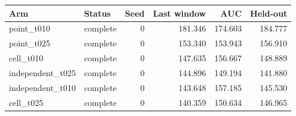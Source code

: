 \begin{tabular}{llrrrr}
Arm & Status & Seed & Last window & AUC & Held-out \\
\hline
point\_t010 & complete & 0 & 181.346 & 174.603 & 184.777 \\
point\_t025 & complete & 0 & 153.340 & 153.943 & 156.910 \\
cell\_t010 & complete & 0 & 147.635 & 156.667 & 148.889 \\
independent\_t025 & complete & 0 & 144.896 & 149.194 & 141.880 \\
independent\_t010 & complete & 0 & 143.648 & 157.185 & 145.530 \\
cell\_t025 & complete & 0 & 140.359 & 150.634 & 146.965 \\
\end{tabular}
